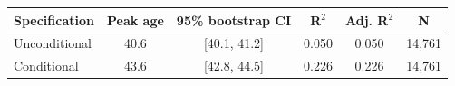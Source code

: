 \begin{tabular}{lccccc}
\toprule
Specification & Peak age & 95\% bootstrap CI & R$^2$ & Adj. R$^2$ & N \\
\midrule
Unconditional & 40.6 & [40.1, 41.2] & 0.050 & 0.050 & 14,761 \\
Conditional & 43.6 & [42.8, 44.5] & 0.226 & 0.226 & 14,761 \\
\bottomrule
\end{tabular}
